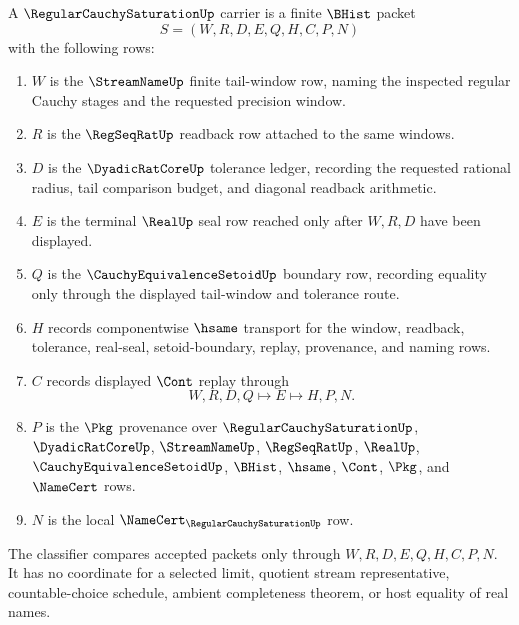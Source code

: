 \begin{definition}
\label{def:regular-cauchy-saturation-carrier}
A $\RegularCauchySaturationUp$ carrier is a finite $\BHist$ packet
$$
S=(W,R,D,E,Q,H,C,P,N)
$$
with the following rows:
\begin{enumerate}
\item $W$ is the $\StreamNameUp$ finite tail-window row, naming the inspected regular Cauchy stages and the requested precision window.
\item $R$ is the $\RegSeqRatUp$ readback row attached to the same windows.
\item $D$ is the $\DyadicRatCoreUp$ tolerance ledger, recording the requested rational radius, tail comparison budget, and diagonal readback arithmetic.
\item $E$ is the terminal $\RealUp$ seal row reached only after $W,R,D$ have been displayed.
\item $Q$ is the $\CauchyEquivalenceSetoidUp$ boundary row, recording equality only through the displayed tail-window and tolerance route.
\item $H$ records componentwise $\hsame$ transport for the window, readback, tolerance, real-seal, setoid-boundary, replay, provenance, and naming rows.
\item $C$ records displayed $\Cont$ replay through
$$
W,R,D,Q \longmapsto E \longmapsto H,P,N .
$$
\item $P$ is the $\Pkg$ provenance over $\RegularCauchySaturationUp$, $\DyadicRatCoreUp$, $\StreamNameUp$, $\RegSeqRatUp$, $\RealUp$, $\CauchyEquivalenceSetoidUp$, $\BHist$, $\hsame$, $\Cont$, $\Pkg$, and $\NameCert$ rows.
\item $N$ is the local $\NameCert_{\RegularCauchySaturationUp}$ row.
\end{enumerate}
The classifier compares accepted packets only through $W,R,D,E,Q,H,C,P,N$. It has no coordinate for a selected limit, quotient stream representative, countable-choice schedule, ambient completeness theorem, or host equality of real names.
\end{definition}

